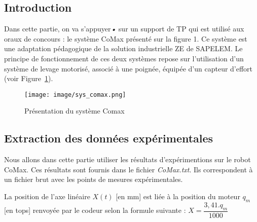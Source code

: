 \subsection{Introduction}

Dans cette partie, on va s’appuyer\emph{•} sur un support de TP qui est utilisé aux oraux de concours : le système CoMax présenté sur la figure 1. Ce système est une adaptation pédagogique de la solution industrielle ZE de SAPELEM. Le principe de fonctionnement de ces deux systèmes repose sur l’utilisation d’un système de levage motorisé, associé à une poignée, équipée d'un capteur d’effort (voir Figure~\ref{sys_comax}).

\begin{figure}[!h]
\centering
\texttt{[image: image/sys\_comax.png]}
\caption{Présentation du système Comax}
\label{sys_comax}
\end{figure}

\subsection{Extraction des données expérimentales}
Nous allons dans cette partie utiliser les résultats d’expérimentions sur le robot CoMax. Ces résultats sont fournis dans le fichier \textit{CoMax.txt}. Ils correspondent à un fichier brut avec les points de mesures expérimentales. 


\vspace{5mm}

\vspace{5mm}
La position de l'axe linéaire $X(t)$ [en mm] est liée à la position du moteur $q_m$ [en tops] renvoyée par le codeur selon la formule suivante : $X = \dfrac{3,41.q_m}{1000}$ 

\vspace{5mm}

